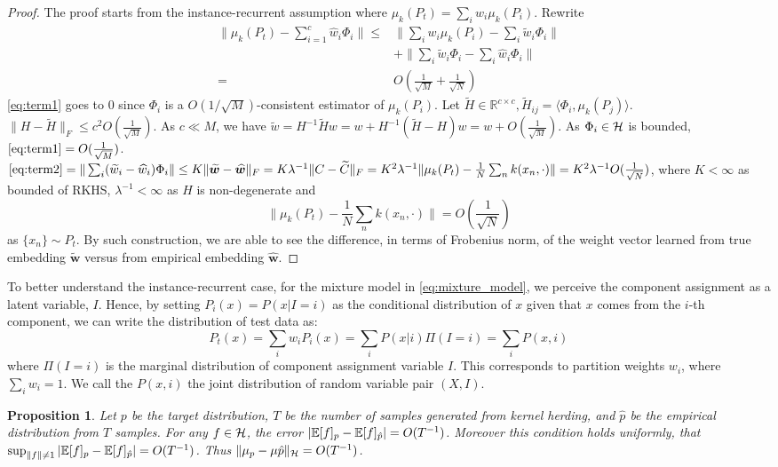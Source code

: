 \documentclass[paper=letter, fontsize=20pt]{article}
\newtheorem{Proposition}{Proposition}
\begin{document}
\begin{proof}
The proof starts from the instance-recurrent assumption where $\mu_k(P_t) = \sum_i w_i \mu_k(P_i) $. Rewrite 
\begin{align}
\|\mu_k(P_t) - \sum_{i=1}^c \widehat{w}_i\Phi_i \| 
\leq& \|\sum_i w_i \mu_k(P_i) - \sum_i \widetilde{w}_i \Phi_i \| \label{eq:term1} \\
&+\|\sum_i \widetilde{w}_i \Phi_i - \sum_i \widehat{w}_i \Phi_i\| \label{eq:term2} \\
=&O(\frac{1}{\sqrt{M}} + \frac{1}{\sqrt{N}})
\end{align}
\eqref{eq:term1} goes to $0$ since $\Phi_i$ is a $O(1/\sqrt{M})$-consistent estimator of $\mu_k(P_i)$.
Let $\widetilde{H}\in \mathbb{R}^{c\times c},\widetilde{H}_{ij}=\langle \Phi_i, \mu_k(P_j)\rangle$. $\|H-\widetilde{H}\|_F\leq c^2 O(\frac{1}{\sqrt{M}})$. As $c \ll M$, we have
$\widetilde{w} = H^{-1}\widetilde{H}w = w + H^{-1}(\widetilde{H} -H)w = w + O(\frac{1}{\sqrt{M}})$. As $\Phi_i \in \mathcal{H}$ is bounded, $\eqref{eq:term1} =O(\frac{1}{\sqrt{M}})$.
$\eqref{eq:term2}=\|\sum_i (\widetilde{w}_i-\widehat{w}_i)\Phi_i\|\leq K\|\widetilde{\bm{w}}-\widehat{\bm{w}}\|_F = K\lambda^{-1}\|C-\widetilde{C}\|_F = K^2\lambda^{-1}\|\mu_k(P_t)- \frac{1}{N}\sum_n k(x_n,\cdot)\| =K^2\lambda^{-1} O(\frac{1}{\sqrt{N}}) $, where $K<\infty$ as bounded of RKHS, $\lambda^{-1}<\infty$ as $H$ is non-degenerate and 
$$\|\mu_k(P_t)- \frac{1}{N}\sum_n k(x_n,\cdot)\|=O(\frac{1}{\sqrt{N}})$$ 
as $\{x_n\} \sim P_t$.
By such construction, we are able to see the difference, in terms of Frobenius norm, of the weight vector learned from true embedding $\widetilde{\bm{w}}$ versus from empirical embedding $\widehat{\bm{w}}$. 
\end{proof}
To better understand the instance-recurrent case, for the mixture model in \eqref{eq:mixture_model}, we perceive the component assignment as a latent variable, $I$. Hence, by setting $P_i(x) = P(x|I=i)$ as the conditional distribution of $x$ given that $x$ comes from the $i$-th component,  we can write the distribution of test data as:
$$P_t(x) = \sum_i w_i P_i(x) = \sum_i P(x|i)\Pi(I=i) = \sum_i P(x, i)$$ 
where $\Pi(I=i)$ is the marginal distribution of component assignment variable $I$. This corresponds to partition weights $w_i$, where $\sum_i w_i = 1$. We call the $P(x,i)$ the joint distribution of random variable pair $(X, I)$.

\begin{Proposition}\label{prop:herding_rate}
\cite[Proposition 4]{kernel_herding}
Let $p$ be the target distribution, $T$ be the number of samples generated from kernel herding, and $\hat{p}$ be the empirical distribution from $T$ samples. For any $f\in \mathcal{H}$, the error $|\mathbb{E}[f]_p - \mathbb{E}[f]_{\hat{p}}| = O(T^{-1})$.   Moreover this condition holds uniformly, that $\sup_{\|f\|\neq 1}|\mathbb{E}[f]_p - \mathbb{E}[f]_{\hat{p}}| = O(T^{-1})$. Thus $\|\mu_p  - \mu{\hat{p}}\|
_{\mathcal{H}}= O(T^{-1})$.
\end{Proposition}
\end{document}
